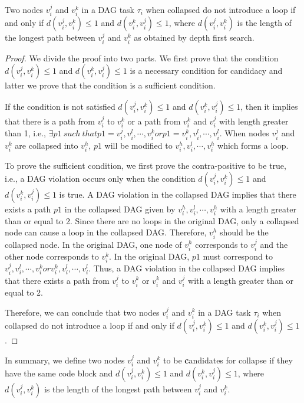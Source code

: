 \begin{theorem} \label{thrm:candidacy-collapse} Two nodes $v_i^j$ and $v_i^k$ in a DAG task $\tau_i$ when collapsed do not introduce a loop if and only if $d(v_i^j, v_i^k) \le 1$ and $d(v_i^k, v_i^j) \le 1$, where $d(v_i^j, v_i^k)$ is the length of the longest path between $v_i^j$ and $v_i^k$ as obtained by depth first search. \end{theorem}
\begin{proof}
We divide the proof into two parts. We first prove that the condition $d(v_i^j, v_i^k) \le 1$ and $d(v_i^k, v_i^j) \le 1$ is a necessary condition for candidacy and latter we prove that the condition is a sufficient condition.

If the condition is not satisfied $d(v_i^j, v_i^k) \le 1$ and $d(v_i^k, v_i^j) \le 1$, then it implies that there is a path from $v_i^j$ to $v_i^k$ or a path from $v_i^k$ and $v_i^j$ with length greater than 1, i.e., $\exists p1 \  such \  that p1 = {v_i^j, v_i^l, \cdots , v_i^k} or p1 = {v_i^k, v_i^l, \cdots , v_i^l}$. When nodes $v_i^j$ and $v_i^k$ are collapsed into $v_i^h$, $p1$ will be modified to ${v_i^h, v_i^l, \cdots , v_i^h}$ which forms a loop. 

To prove the sufficient condition, we first prove the contra-positive to be true, i.e., a DAG violation occurs only when the condition $d(v_i^j, v_i^k) \le 1$ and $d(v_i^k, v_i^j) \le 1$ is true. A DAG violation in the collapsed DAG implies that there exists a path $p1$ in the collapsed DAG given by $v_i^h, v_i^l, \cdots , v_i^h$ with a length greater than or equal to 2.  Since there are no loops in the original DAG, only a collapsed node can cause a loop in the collapsed DAG. Therefore, $v_i^h$ should be the collapsed node. In the original DAG, one node of $v_i^h$ corresponds to $v_i^j$ and the other node corresponds to $v_i^k$. In the original DAG, $p1$ must correspond to ${v_i^j, v_i^l, \cdots , v_i^k} or {v_i^k, v_i^l, \cdots , v_i^l}$. Thus, a DAG violation in the collapsed DAG implies that there exists a path from $v_i^j$ to $v_i^k$  or $v_i^k$ and $v_i^j$ with a length greater than or equal to 2. 

Therefore, we can conclude that two nodes $v_i^j$ and $v_i^k$ in a DAG task $\tau_i$ when collapsed do not introduce a loop if and only if $d(v_i^j, v_i^k) \le 1$ and $d(v_i^k, v_i^j) \le 1$.
\end{proof}

In summary, we define two nodes $v_i^j$ and $v_i^k$ to be {\textbf candidates for collapse} if they have the same code block and $d(v_i^j, v_i^k) \le 1$ and $d(v_i^k, v_i^j) \le 1$, where $d(v_i^j, v_i^k)$ is the length of the longest path between $v_i^j$ and $v_i^k$.
